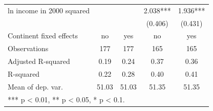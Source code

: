 \begin{tabular}[t]{lcccc}
\hspace{1em}ln income in 2000 squared &  &  & 2.038*** & 1.936***\\
\hspace{1em} &  &  & (0.406) & (0.431)\\
\midrule
Continent fixed effects & no & yes & no & yes\\
Observations & 177 & 177 & 165 & 165\\
Adjusted R-squared & 0.19 & 0.24 & 0.37 & 0.36\\
R-squared & 0.22 & 0.28 & 0.40 & 0.41\\
Mean of dep. var. & 51.03 & 51.03 & 51.35 & 51.35\\
\bottomrule
\multicolumn{5}{l}{\rule{0pt}{1em}*** p < 0.01, ** p < 0.05, * p < 0.1.}\\
\end{tabular}

